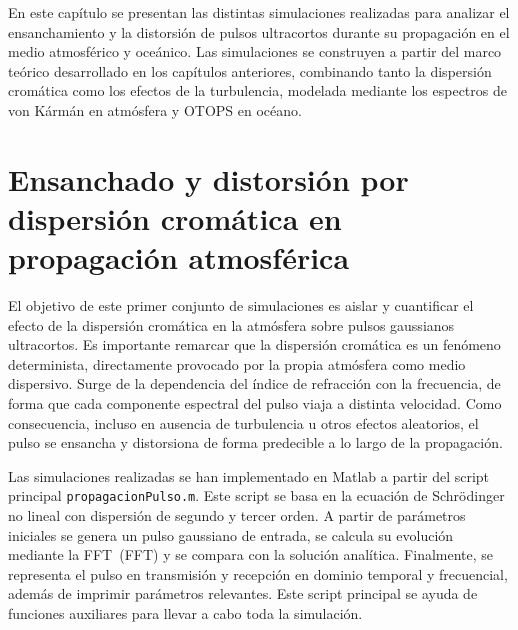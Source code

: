 
\label{chp:Utiliz}

\begin{sinopsis}
\label{sec:chpltx:sinop}
En este capítulo se presentan las distintas simulaciones realizadas para analizar el ensanchamiento y la distorsión de pulsos ultracortos durante su propagación en el medio atmosférico y oceánico. Las simulaciones se construyen a partir del marco teórico desarrollado en los capítulos anteriores, combinando tanto la dispersión cromática como los efectos de la turbulencia, modelada mediante los espectros de von Kármán en atmósfera y OTOPS en océano.
\end{sinopsis}

\section{Ensanchado y distorsión por dispersión cromática en propagación atmosférica}
El objetivo de este primer conjunto de simulaciones es aislar y cuantificar el efecto de la dispersión cromática en la atmósfera sobre pulsos gaussianos ultracortos. Es importante remarcar que la dispersión cromática es un fenómeno determinista, directamente provocado por la propia atmósfera como medio dispersivo. Surge de la dependencia del índice de refracción con la frecuencia, de forma que cada componente espectral del pulso viaja a distinta velocidad. Como consecuencia, incluso en ausencia de turbulencia u otros efectos aleatorios, el pulso se ensancha y distorsiona de forma predecible a lo largo de la propagación.

Las simulaciones realizadas se han implementado en Matlab a partir del script principal \texttt{propagacionPulso.m}. Este script se basa en la ecuación de Schrödinger no lineal con dispersión de segundo y tercer orden. A partir de parámetros iniciales se genera un pulso gaussiano de entrada, se calcula su evolución mediante la \acs{FFT}~(\acl{FFT}) y se compara con la solución analítica. Finalmente, se representa el pulso en transmisión y recepción en dominio temporal y frecuencial, además de imprimir parámetros relevantes. Este script principal se ayuda de funciones auxiliares para llevar a cabo toda la simulación.

